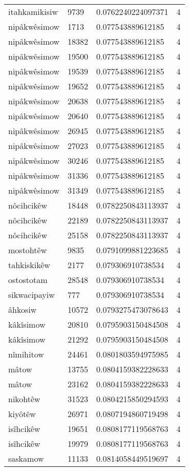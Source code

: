 \begin{longtable}{llll}
itahkamikisiw & 9739 & 0.0762240224097371 & 4 \\
nipâkwêsimow & 1713 & 0.077543889612185 & 4 \\
nipâkwêsimow & 18382 & 0.077543889612185 & 4 \\
nipâkwêsimow & 19500 & 0.077543889612185 & 4 \\
nipâkwêsimow & 19539 & 0.077543889612185 & 4 \\
nipâkwêsimow & 19652 & 0.077543889612185 & 4 \\
nipâkwêsimow & 20638 & 0.077543889612185 & 4 \\
nipâkwêsimow & 20640 & 0.077543889612185 & 4 \\
nipâkwêsimow & 26945 & 0.077543889612185 & 4 \\
nipâkwêsimow & 27023 & 0.077543889612185 & 4 \\
nipâkwêsimow & 30246 & 0.077543889612185 & 4 \\
nipâkwêsimow & 31336 & 0.077543889612185 & 4 \\
nipâkwêsimow & 31349 & 0.077543889612185 & 4 \\
nôcihcikêw & 18448 & 0.0782250843113937 & 4 \\
nôcihcikêw & 22189 & 0.0782250843113937 & 4 \\
nôcihcikêw & 25158 & 0.0782250843113937 & 4 \\
mostohtêw & 9835 & 0.0791099881223685 & 4 \\
tahkiskikêw & 2177 & 0.079306910738534 & 4 \\
ostostotam & 28548 & 0.079306910738534 & 4 \\
sikwacipayiw & 777 & 0.079306910738534 & 4 \\
âhkosiw & 10572 & 0.0793275473078643 & 4 \\
kâkîsimow & 20810 & 0.0795903150484508 & 4 \\
kâkîsimow & 21292 & 0.0795903150484508 & 4 \\
nîmihitow & 24461 & 0.0801803594975985 & 4 \\
mâtow & 13755 & 0.0804159382228633 & 4 \\
mâtow & 23162 & 0.0804159382228633 & 4 \\
nikohtêw & 31523 & 0.0804215850294593 & 4 \\
kiyôtêw & 26971 & 0.0807194860719498 & 4 \\
isîhcikêw & 19651 & 0.0808177119568763 & 4 \\
isîhcikêw & 19979 & 0.0808177119568763 & 4 \\
saskamow & 11133 & 0.0814058449519697 & 4 \\

\end{longtable}
